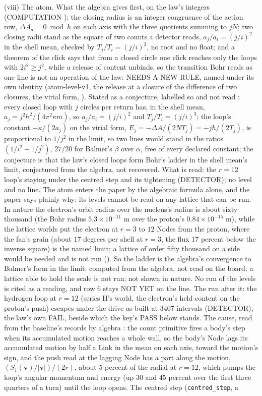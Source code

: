 (viii) The atom. What the algebra gives first, on the law's integers (COMPUTATION \cite{atomalgebra}): the closing radius is an integer congruence of the action row, $\Delta A_a = 0 \bmod h$ on each axis with the three quotients summing to $jN$; two closing radii stand as the square of two counts a detector reads, $a_j/a_i = (j/i)^2$ in the shell mean, checked by $T_j/T_i = (j/i)^3$, no root and no float; and a theorem of the click says that from a closed circle one click reaches only the loops with $2i^2 \ge j^2$, while a release of content unbinds, so the transition Bohr reads as one line is not an operation of the law: NEEDS A NEW RULE, named under its own identity (atom-level-v1, the release at a closure of the difference of two closures, the virial form, \cite{atomlevels}). Stated as a conjecture, labelled so and not read \cite{atomalgebra,atomlevels}: every closed loop with $j$ circles per return has, in the shell mean, $a_j = j^2h^2/(4\pi^2\kappa m)$, so $a_j/a_i = (j/i)^2$ and $T_j/T_i = (j/i)^3$; the loop's constant $-\kappa/(2a_j)$ on the virial form, $E_j = -\Delta A/(2NT_j) = -jh/(2T_j)$, is proportional to $1/j^2$ in the limit, so two lines would stand in the ratios $(1/i^2 - 1/j^2)$, $27/20$ for Balmer's $\beta$ over $\alpha$, free of every declared constant; the conjecture is that the law's closed loops form Bohr's ladder in the shell mean's limit, conjectured from the algebra, not recovered. What is read: the $r = 12$ loop's staying under the centred step and its tightening (DETECTOR); no level and no line. The atom enters the paper by the algebraic formula alone, and the paper says plainly why: its levels cannot be read on any lattice that can be run. In nature the electron's orbit radius over the nucleus's radius is about sixty thousand (the Bohr radius $5.3 \times 10^{-11}$ m over the proton's $0.84 \times 10^{-15}$ m), while the lattice worlds put the electron at $r = 3$ to $12$ Nodes from the proton, where the fan's grain (about $17$ degrees per shell at $r = 3$, the flux $17$ percent below the inverse square) is the named limit; a lattice of order fifty thousand on a side would be needed and is not run (\cite[record 997, pending merge]{log}). So the ladder is the algebra's convergence to Balmer's form in the limit: computed from the algebra, not read on the board; a lattice able to hold the scale is not run; not shown in nature. No run of the levels is cited as a reading, and row 6 stays NOT YET on the line. The run after it: the hydrogen loop at $r = 12$ (series H's world, the electron's held content on the proton's push) escapes under the drive as built at $3407$ intervals (DETECTOR), the law's own FAIL, beside which the key's PASS below stands. The cause, read from the baseline's records by algebra \cite{atomcause}: the count primitive fires a body's step when its accumulated motion reaches a whole wall, so the body's Node lags its accumulated motion by half a Link in the mean on each axis, toward the motion's sign, and the push read at the lagging Node has a part along the motion, $(S_1(\mathbf v)/|\mathbf v|)/(2r)$, about $5$ percent of the radial at $r = 12$, which pumps the loop's angular momentum and energy (up $30$ and $45$ percent over the first three quarters of a turn) until the loop opens. The centred step (\texttt{centred\_step}, a 
